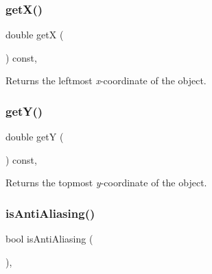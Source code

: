 \mbox{\label{classsgl_1_1GObject_a344385751bee0720059403940d57a13e}} 
\subsubsection{\texorpdfstring{get\+X()}{getX()}}
{\footnotesize\ttfamily double getX (\begin{DoxyParamCaption}{ }\end{DoxyParamCaption}) const\hspace{0.3cm}{\ttfamily [virtual]}, {\ttfamily [inherited]}}



Returns the leftmost {\itshape x}-\/coordinate of the object. 

\mbox{\label{classsgl_1_1GObject_aafa51c7f8f38a09febbb9ce7853f77b4}} 
\subsubsection{\texorpdfstring{get\+Y()}{getY()}}
{\footnotesize\ttfamily double getY (\begin{DoxyParamCaption}{ }\end{DoxyParamCaption}) const\hspace{0.3cm}{\ttfamily [virtual]}, {\ttfamily [inherited]}}



Returns the topmost {\itshape y}-\/coordinate of the object. 

\mbox{\label{classsgl_1_1GObject_a93be0e1fe1b1bf1a1da732470c94f42b}} 
\subsubsection{\texorpdfstring{is\+Anti\+Aliasing()}{isAntiAliasing()}}
{\footnotesize\ttfamily bool is\+Anti\+Aliasing (\begin{DoxyParamCaption}{ }\end{DoxyParamCaption})\hspace{0.3cm}{\ttfamily [static]}, {\ttfamily [inherited]}}



